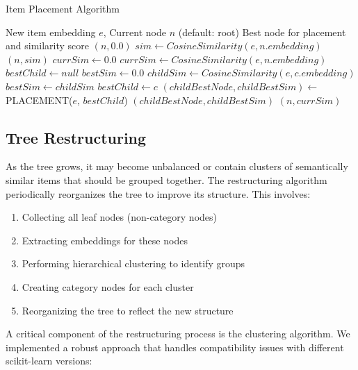 \documentclass[conference]{IEEEtran}
\begin{document}
\begin{algorithm}
\caption{Item Placement Algorithm}
\label{alg:placement}
\begin{algorithmic}[1]
\REQUIRE New item embedding $e$, Current node $n$ (default: root)
\ENSURE Best node for placement and similarity score
        \RETURN $(n, 0.0)$
    \ELSE
        \STATE $sim \gets CosineSimilarity(e, n.embedding)$
        \RETURN $(n, sim)$
    \ENDIF
\ENDIF
\STATE $currSim \gets 0.0$
    \STATE $currSim \gets CosineSimilarity(e, n.embedding)$
\ENDIF
\STATE $bestChild \gets null$
\STATE $bestSim \gets 0.0$
        \STATE $childSim \gets CosineSimilarity(e, c.embedding)$
            \STATE $bestSim \gets childSim$
            \STATE $bestChild \gets c$
        \ENDIF
    \ENDIF
\ENDFOR
{}
    \STATE $(childBestNode, childBestSim) \gets$ PLACEMENT($e$, $bestChild$)
        \RETURN $(childBestNode, childBestSim)$
    \ENDIF
\ENDIF
\RETURN $(n, currSim)$
\end{algorithmic}
\end{algorithm}

\subsection{Tree Restructuring}

As the tree grows, it may become unbalanced or contain clusters of semantically similar items that should be grouped together. The restructuring algorithm periodically reorganizes the tree to improve its structure. This involves:

\begin{enumerate}
    \item Collecting all leaf nodes (non-category nodes)
    \item Extracting embeddings for these nodes
    \item Performing hierarchical clustering to identify groups
    \item Creating category nodes for each cluster
    \item Reorganizing the tree to reflect the new structure
\end{enumerate}

A critical component of the restructuring process is the clustering algorithm. We implemented a robust approach that handles compatibility issues with different scikit-learn versions:
\end{document}
